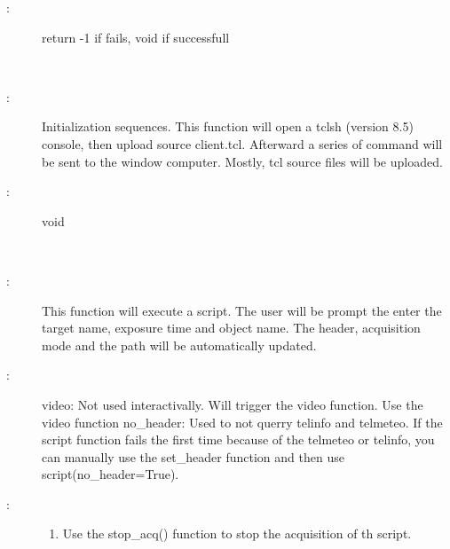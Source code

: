\documentclass[letterpaper,10pt,english]{sphinxmanual}
\begin{document}
\begin{fulllineitems}
\begin{fulllineitems}
\begin{description}
\item[{:}] \leavevmode
return -1 if fails, void if successfull

\end{description}

\end{fulllineitems}


\begin{fulllineitems}
\label{\detokenize{index:python_andor.command.initialize}}~\begin{description}
\item[{:}] \leavevmode
Initialization sequences. This function will open a tclsh (version 8.5) console, then upload source client.tcl. Afterward a series of command will be sent to the window computer. Mostly, tcl source files will be uploaded.

\item[{:}] \leavevmode
void

\end{description}

\end{fulllineitems}


\begin{fulllineitems}
\label{\detokenize{index:python_andor.command.script}}~\begin{description}
\item[{:}] \leavevmode
This function will execute a script. The user will be prompt the enter the target name, exposure time and object name. The header, acquisition mode and the path will be automatically updated.

\item[{:}] \leavevmode
\textendash{}video\textendash{}: Not used interactivally. Will trigger the video function. Use the video function
\textendash{}no\_header: Used to not querry telinfo and telmeteo. If the script function fails the first time because of the telmeteo or telinfo, you can manually use the set\_header function and then use script(no\_header=True).

\item[{:}] \leavevmode\begin{enumerate}
\item {} 
Use the stop\_acq() function to stop the acquisition of th script.


\end{enumerate}
\end{description}
\end{fulllineitems}
\end{fulllineitems}
\end{document}
